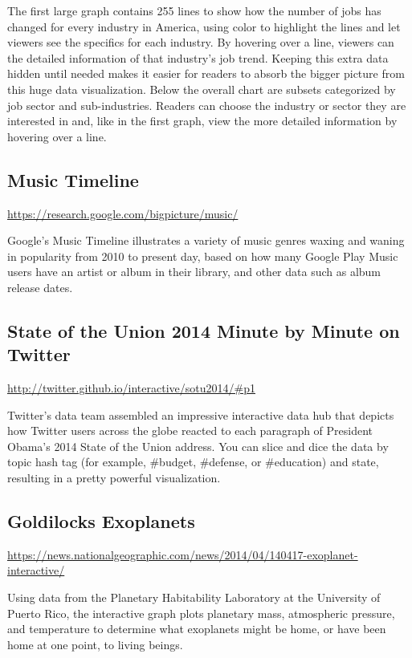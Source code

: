 \documentclass[]{book}
\theoremstyle{definition}
\theoremstyle{definition}
\theoremstyle{definition}
\theoremstyle{remark}
\begin{document}
The first large graph contains 255 lines to show how the number of jobs
has changed for every industry in America, using color to highlight the
lines and let viewers see the specifics for each industry. By hovering
over a line, viewers can the detailed information of that industry's job
trend. Keeping this extra data hidden until needed makes it easier for
readers to absorb the bigger picture from this huge data visualization.
Below the overall chart are subsets categorized by job sector and
sub-industries. Readers can choose the industry or sector they are
interested in and, like in the first graph, view the more detailed
information by hovering over a line. \citep{recession_economy}

\subsection{Music Timeline}\label{music-timeline}

\url{https://research.google.com/bigpicture/music/}

Google's Music Timeline illustrates a variety of music genres waxing and
waning in popularity from 2010 to present day, based on how many Google
Play Music users have an artist or album in their library, and other
data such as album release dates.

\subsection{State of the Union 2014 Minute by Minute on
Twitter}\label{state-of-the-union-2014-minute-by-minute-on-twitter}

\url{http://twitter.github.io/interactive/sotu2014/\#p1}

Twitter's data team assembled an impressive interactive data hub that
depicts how Twitter users across the globe reacted to each paragraph of
President Obama's 2014 State of the Union address. You can slice and
dice the data by topic hash tag (for example, \#budget, \#defense, or
\#education) and state, resulting in a pretty powerful visualization.

\subsection{Goldilocks Exoplanets}\label{goldilocks-exoplanets}

\url{https://news.nationalgeographic.com/news/2014/04/140417-exoplanet-interactive/}

Using data from the Planetary Habitability Laboratory at the University
of Puerto Rico, the interactive graph plots planetary mass, atmospheric
pressure, and temperature to determine what exoplanets might be home, or
have been home at one point, to living beings.
\end{document}
